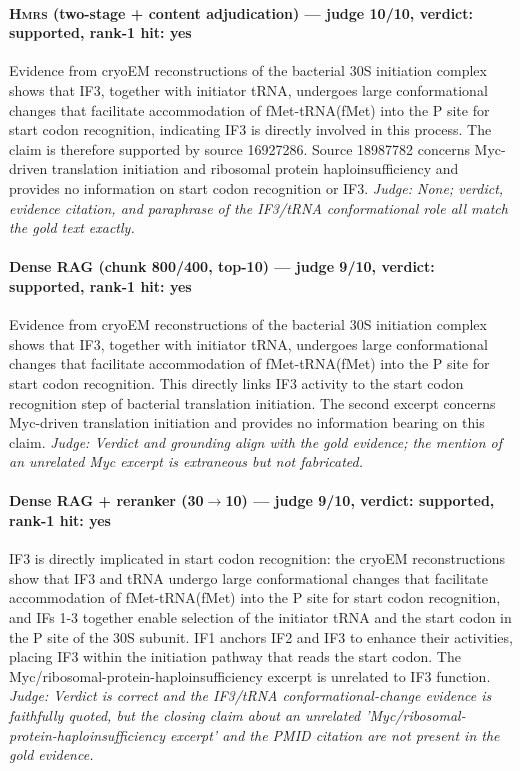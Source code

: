 \documentclass[sigconf, review, anonymous]{acmart}
\begin{document}
\paragraph{\textbf{\textsc{Hmrs}} (two-stage + content adjudication) --- judge 10/10, verdict: supported, rank-1 hit: yes}
\noindent Evidence from cryoEM reconstructions of the bacterial 30S initiation complex shows that IF3, together with initiator tRNA, undergoes large conformational changes that facilitate accommodation of fMet-tRNA(fMet) into the P site for start codon recognition, indicating IF3 is directly involved in this process. The claim is therefore supported by source 16927286. Source 18987782 concerns Myc-driven translation initiation and ribosomal protein haploinsufficiency and provides no information on start codon recognition or IF3.
\noindent\small\textit{Judge: None; verdict, evidence citation, and paraphrase of the IF3/tRNA conformational role all match the gold text exactly.}
\paragraph{Dense RAG (chunk 800/400, top-10) --- judge 9/10, verdict: supported, rank-1 hit: yes}
\noindent Evidence from cryoEM reconstructions of the bacterial 30S initiation complex shows that IF3, together with initiator tRNA, undergoes large conformational changes that facilitate accommodation of fMet-tRNA(fMet) into the P site for start codon recognition. This directly links IF3 activity to the start codon recognition step of bacterial translation initiation. The second excerpt concerns Myc-driven translation initiation and provides no information bearing on this claim.
\noindent\small\textit{Judge: Verdict and grounding align with the gold evidence; the mention of an unrelated Myc excerpt is extraneous but not fabricated.}
\paragraph{Dense RAG + reranker (30$\to$10) --- judge 9/10, verdict: supported, rank-1 hit: yes}
\noindent IF3 is directly implicated in start codon recognition: the cryoEM reconstructions show that IF3 and tRNA undergo large conformational changes that facilitate accommodation of fMet-tRNA(fMet) into the P site for start codon recognition, and IFs 1-3 together enable selection of the initiator tRNA and the start codon in the P site of the 30S subunit. IF1 anchors IF2 and IF3 to enhance their activities, placing IF3 within the initiation pathway that reads the start codon. The Myc/ribosomal-protein-haploinsufficiency excerpt is unrelated to IF3 function.
\noindent\small\textit{Judge: Verdict is correct and the IF3/tRNA conformational-change evidence is faithfully quoted, but the closing claim about an unrelated 'Myc/ribosomal-protein-haploinsufficiency excerpt' and the PMID citation are not present in the gold evidence.}
\end{document}
